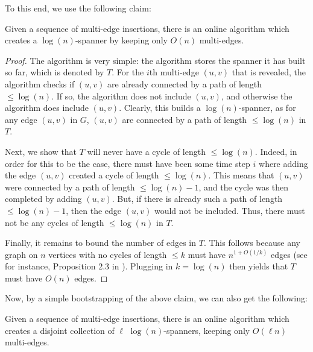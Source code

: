 \documentclass{article}
\begin{document}
To this end, we use the following claim:

\begin{claim}\label{clm:onlineSingleSpanner}
    Given a sequence of multi-edge insertions, there is an online algorithm which creates a $\log(n)$-spanner by keeping only $O(n)$ multi-edges.
\end{claim}

\begin{proof}
    The algorithm is very simple: the algorithm stores the spanner it has built so far, which is denoted by $T$. For the $i$th multi-edge $(u,v)$ that is revealed, the algorithm checks if $(u,v)$ are already connected by a path of length $\leq \log(n)$. If so, the algorithm does not include $(u,v)$, and otherwise the algorithm does include $(u,v)$. Clearly, this builds a $\log(n)$-spanner, as for any edge $(u,v)$ in $G$, $(u,v)$ are connected by a path of length $\leq \log(n)$ in $T$. 

    Next, we show that $T$ will never have a cycle of length $\leq \log(n)$. Indeed, in order for this to be the case, there must have been some time step $i$ where adding the edge $(u,v)$ created a cycle of length $\leq \log(n)$. This means that $(u,v)$ were connected by a path of length $\leq \log(n) - 1$, and the cycle was then completed by adding $(u,v)$. But, if there is already such a path of length $\leq \log(n) - 1$, then the edge $(u,v)$ would not be included. Thus, there must not be any cycles of length $\leq \log(n)$ in $T$. 

    Finally, it remains to bound the number of edges in $T$. This follows because any graph on $n$ vertices with no cycles of length $\leq k$ must have $n^{1 + O(1/k)}$ edges (see for instance, Proposition 2.3 in \cite{ABSHJKS20}). Plugging in $k = \log(n)$ then yields that $T$ must have $O(n)$ edges. 
\end{proof}

Now, by a simple bootstrapping of the above claim, we can also get the following:

\begin{claim}\label{clm:onlineDisjointSpanners}
    Given a sequence of multi-edge insertions, there is an online algorithm which creates a disjoint collection of $\ell$ $\log(n)$-spanners, keeping only $O(\ell n)$ multi-edges.
\end{claim}
\end{document}
